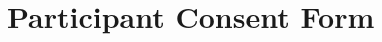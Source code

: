 \documentclass[12pt,a4paper,twoside,openright]{book}
\begin{document}
\chapter{Participant Consent Form}
\label{appendix_participant_consent_form}
\end{document}
